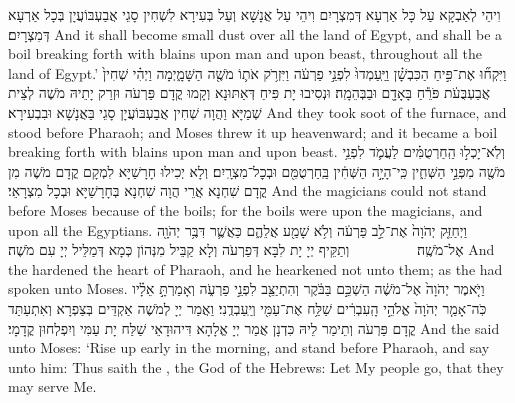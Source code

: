 {וִיהֵי לְאַבְקָא עַל כָּל אַרְעָא דְּמִצְרָיִם וִיהֵי עַל אֲנָשָׁא וְעַל בְּעִירָא לִשְׁחִין סָגֵי אֲבַעְבּוֹעֲיָן בְּכָל אַרְעָא דְּמִצְרָיִם׃}
{And it shall become small dust over all the land of Egypt, and shall be a boil breaking forth with blains upon man and upon beast, throughout all the land of Egypt.’}{}
{וַיִּקְח֞וּ אֶת־פִּ֣יחַ הַכִּבְשָׁ֗ן וַיַּֽעַמְדוּ֙ לִפְנֵ֣י פַרְעֹ֔ה וַיִּזְרֹ֥ק אֹת֛וֹ מֹשֶׁ֖ה הַשָּׁמָ֑יְמָה וַיְהִ֗י שְׁחִין֙ אֲבַעְבֻּעֹ֔ת פֹּרֵ֕חַ בָּאָדָ֖ם וּבַבְּהֵמָֽה׃
}
{וּנְסִיבוּ יָת פִּיחַ דְּאַתּוּנָא וְקָמוּ קֳדָם פַּרְעֹה וּזְרַק יָתֵיהּ מֹשֶׁה לְצֵית שְׁמַיָּא וַהֲוָה שְׁחִין אֲבַעְבּוֹעֲיָן סָגֵי בַּאֲנָשָׁא וּבִבְעִירָא׃}
{And they took soot of the furnace, and stood before Pharaoh; and Moses threw it up heavenward; and it became a boil breaking forth with blains upon man and upon beast.}{}
{וְלֹֽא־יָכְל֣וּ הַֽחַרְטֻמִּ֗ים לַעֲמֹ֛ד לִפְנֵ֥י מֹשֶׁ֖ה מִפְּנֵ֣י הַשְּׁחִ֑ין כִּֽי־הָיָ֣ה הַשְּׁחִ֔ין בַּֽחַרְטֻמִּ֖ם וּבְכׇל־מִצְרָֽיִם׃}
{וְלָא יְכִילוּ חָרָשַׁיָּא לִמְקָם קֳדָם מֹשֶׁה מִן קֳדָם שִׁחְנָא אֲרֵי הֲוָה שִׁחְנָא בְּחָרָשַׁיָּא וּבְכָל מִצְרָאֵי׃}
{And the magicians could not stand before Moses because of the boils; for the boils were upon the magicians, and upon all the Egyptians.}{}
{וַיְחַזֵּ֤ק יְהֹוָה֙ אֶת־לֵ֣ב פַּרְעֹ֔ה וְלֹ֥א שָׁמַ֖ע אֲלֵהֶ֑ם כַּאֲשֶׁ֛ר דִּבֶּ֥ר יְהֹוָ֖ה אֶל־מֹשֶֽׁה׃ \setuma         }
{וְתַקֵּיף יְיָ יָת לִבָּא דְּפַרְעֹה וְלָא קַבֵּיל מִנְּהוֹן כְּמָא דְּמַלֵּיל יְיָ עִם מֹשֶׁה׃}
{And the \lord\space hardened the heart of Pharaoh, and he hearkened not unto them; as the \lord\space had spoken unto Moses.}{}
{וַיֹּ֤אמֶר יְהֹוָה֙ אֶל־מֹשֶׁ֔ה הַשְׁכֵּ֣ם בַּבֹּ֔קֶר וְהִתְיַצֵּ֖ב לִפְנֵ֣י פַרְעֹ֑ה וְאָמַרְתָּ֣ אֵלָ֗יו כֹּֽה־אָמַ֤ר יְהֹוָה֙ אֱלֹהֵ֣י הָֽעִבְרִ֔ים שַׁלַּ֥ח אֶת־עַמִּ֖י וְיַֽעַבְדֻֽנִי׃}
{וַאֲמַר יְיָ לְמֹשֶׁה אַקְדֵּים בְּצַפְרָא וְאִתְעַתַּד קֳדָם פַּרְעֹה וְתֵימַר לֵיהּ כִּדְנָן אֲמַר יְיָ אֱלָהָא דִּיהוּדָאֵי שַׁלַּח יָת עַמִּי וְיִפְלְחוּן קֳדָמָי׃}
{And the \lord\space said unto Moses: ‘Rise up early in the morning, and stand before Pharaoh, and say unto him: Thus saith the \lord, the God of the Hebrews: Let My people go, that they may serve Me.}{}
